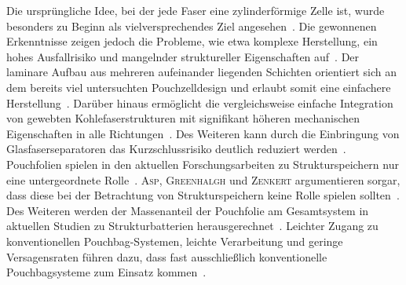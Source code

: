 Die ursprüngliche Idee, bei der jede Faser eine zylinderförmige Zelle ist, wurde besonders zu Beginn als vielversprechendes Ziel angesehen~\cite{Ekstedt2010, Leijonmarck2013, Asp2014}. Die gewonnenen Erkenntnisse zeigen jedoch die Probleme, wie etwa komplexe Herstellung, ein hohes Ausfallrisiko und mangelnder struktureller Eigenschaften auf~\cite{Asp2015,Johannisson2018,Asp2021, Ye2024}. Der laminare Aufbau aus mehreren aufeinander liegenden Schichten orientiert sich an dem bereits viel untersuchten Pouchzelldesign und erlaubt somit eine einfachere Herstellung~\cite{Johannisson2018, Xu2022, Siraj2023}. Darüber hinaus ermöglicht die vergleichsweise einfache Integration von gewebten Kohlefaserstrukturen mit signifikant höheren mechanischen Eigenschaften in alle Richtungen~\cite{Xu2022}. Des Weiteren kann durch die Einbringung von Glasfaserseparatoren das Kurzschlussrisiko deutlich reduziert werden~\cite{Siraj2023}. Pouchfolien spielen in den aktuellen Forschungsarbeiten zu Strukturspeichern nur eine untergeordnete Rolle~\cite{Jin2023}. \textsc{Asp}, \textsc{Greenhalgh} und \textsc{Zenkert} argumentieren sorgar, dass diese bei der Betrachtung von Strukturspeichern keine Rolle spielen sollten~\cite{Asp2024}. Des Weiteren werden der Massenanteil der Pouchfolie am Gesamtsystem in aktuellen Studien zu Strukturbatterien herausgerechnet~\cite{Danzi2021,Ye2024}. Leichter Zugang zu konventionellen Pouchbag-Systemen, leichte Verarbeitung und geringe Versagensraten führen dazu, dass fast ausschließlich konventionelle Pouchbagsysteme zum Einsatz kommen~\cite{Jin2023,Ye2024}.

